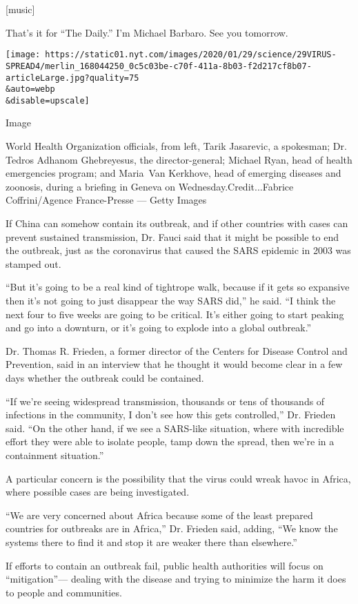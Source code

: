 {[}music{]}

That's it for ``The Daily.'' I'm Michael Barbaro. See you tomorrow.

\texttt{[image: https://static01.nyt.com/images/2020/01/29/science/29VIRUS-SPREAD4/merlin\_168044250\_0c5c03be-c70f-411a-8b03-f2d217cf8b07-articleLarge.jpg?quality=75\\\&auto=webp\\\&disable=upscale]}

Image

World Health Organization officials, from left, Tarik Jasarevic, a
spokesman; Dr. Tedros Adhanom Ghebreyesus, the director-general; Michael
Ryan, head of health emergencies program; and Maria~Van Kerkhove, head
of emerging diseases and zoonosis, during a briefing in Geneva on
Wednesday.Credit...Fabrice Coffrini/Agence France-Presse --- Getty
Images

If China can somehow contain its outbreak, and if other countries with
cases can prevent sustained transmission, Dr. Fauci said that it might
be possible to end the outbreak, just as the coronavirus that caused the
SARS epidemic in 2003 was stamped out.

``But it's going to be a real kind of tightrope walk, because if it gets
so expansive then it's not going to just disappear the way SARS did,''
he said. ``I think the next four to five weeks are going to be critical.
It's either going to start peaking and go into a downturn, or it's going
to explode into a global outbreak.''

Dr. Thomas R. Frieden, a former director of the Centers for Disease
Control and Prevention, said in an interview that he thought it would
become clear in a few days whether the outbreak could be contained.

``If we're seeing widespread transmission, thousands or tens of
thousands of infections in the community, I don't see how this gets
controlled,'' Dr. Frieden said. ``On the other hand, if we see a
SARS-like situation, where with incredible effort they were able to
isolate people, tamp down the spread, then we're in a containment
situation.''

A particular concern is the possibility that the virus could wreak havoc
in Africa, where possible cases are being investigated.

``We are very concerned about Africa because some of the least prepared
countries for outbreaks are in Africa,'' Dr. Frieden said, adding, ``We
know the systems there to find it and stop it are weaker there than
elsewhere.''

If efforts to contain an outbreak fail, public health authorities will
focus on ``mitigation''--- dealing with the disease and trying to
minimize the harm it does to people and communities.


